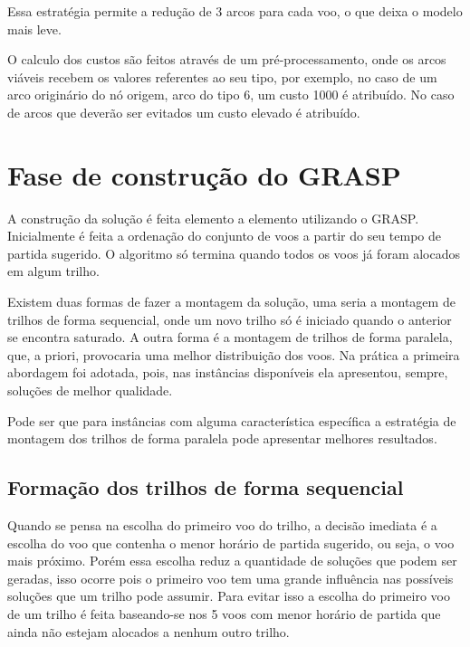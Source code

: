Essa estratégia permite a redução de 3 arcos para cada voo, o que deixa o
modelo mais leve.

O calculo dos custos são feitos através de um pré-processamento, onde os arcos
viáveis recebem os valores referentes ao seu tipo, por exemplo, no caso de um
arco originário do nó origem, arco do tipo 6, um custo 1000 é atribuído. No
caso de arcos que deverão ser evitados um custo elevado é atribuído.
  	
  	

  
\section{Fase de construção do GRASP}
  
A construção da solução é feita elemento a elemento utilizando o
GRASP. Inicialmente é feita a ordenação do conjunto de voos a partir do seu
tempo de partida sugerido. O algoritmo só termina quando todos os voos já
foram alocados em algum trilho.
  
Existem duas formas de fazer a montagem da solução, uma seria a montagem de
trilhos de forma sequencial, onde um novo trilho só é iniciado quando o anterior
se encontra saturado. A outra forma é a montagem de trilhos de forma paralela,
que, a priori, provocaria uma melhor distribuição dos voos. Na prática a
primeira abordagem foi adotada, pois, nas instâncias disponíveis ela apresentou,
sempre, soluções de melhor qualidade. 

Pode ser que para instâncias com alguma característica específica a
estratégia de montagem dos trilhos de forma paralela pode apresentar melhores
resultados.


  
\subsection{Formação dos trilhos de forma sequencial}

Quando se pensa na escolha do primeiro voo do trilho, a decisão imediata é a
escolha do voo que contenha o menor horário de partida sugerido, ou seja, o voo
mais próximo. Porém essa escolha reduz a quantidade de soluções que podem ser
geradas, isso ocorre pois o primeiro voo tem uma grande influência nas
possíveis soluções que um trilho pode assumir. Para evitar isso a escolha do
primeiro voo de um trilho é feita baseando-se nos 5 voos com menor horário de
partida que ainda não estejam alocados a nenhum outro trilho. 

